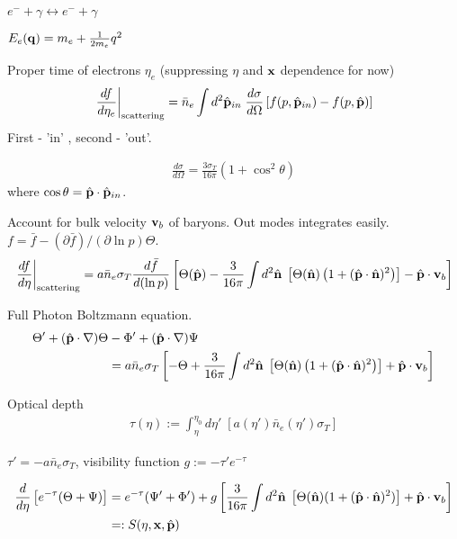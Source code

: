 $e^- + \gamma \leftrightarrow e^- + \gamma$

$E_e (\mathbf{q}) = m_e + \frac{1}{2m_e} q^2$

Proper time of electrons $\eta_e$ (suppressing $\eta$ and $\mathbf{x}$ dependence for now)
\begin{align}
	\left. \frac{df}{d\eta_e} \right|_\text{scattering} = \bar{n}_e \int d^2 \hat{\mathbf{p}}_{in} \; \frac{d\sigma}{d\Omega} \left[ f(p,\hat{\mathbf{p}}_{in}) - f(p,\hat{\mathbf{p}})\right]
\end{align}
First - 'in' , second - 'out'.

\begin{align}
	\frac{d\sigma}{d\Omega} = \frac{3\sigma_T}{16\pi} (1 + \cos^2 \theta)
\end{align}
where $\cos\theta = \hat{\mathbf{p}} \cdot \hat{\mathbf{p}}_{in}$.

Account for bulk velocity $\mathbf{v}_b$ of baryons. Out modes integrates easily. $f = \bar{f} - (\partial\bar{f})/(\partial\ln p) \Theta$.
\begin{align}
	\left. \frac{df}{d\eta} \right|_\text{scattering} = a \bar{n}_e \sigma_T \frac{d\bar{f}}{d(\ln p)}  \left[ \Theta(\hat{\mathbf{p}}) - \frac{3}{16\pi} \int d^2 \hat{\mathbf{n}} \; \left[ \Theta(\hat{\mathbf{n}}) \left( 1 + (\hat{\mathbf{p}} \cdot \hat{\mathbf{n}})^2 \right) \right] - \hat{\mathbf{p}} \cdot \mathbf{v}_b \right]
\end{align}

Full Photon Boltzmann equation.
\begin{align}
	\Theta' + (\hat{\mathbf{p}} \cdot \nabla) \Theta &- \Phi' +(\hat{\mathbf{p}} \cdot \nabla) \Psi  \nonumber \\	
	&= a \bar{n}_e \sigma_T \left[ -\Theta + \frac{3}{16\pi} \int d^2 \hat{\mathbf{n}} \; \left[ \Theta(\hat{\mathbf{n}}) \left( 1 + (\hat{\mathbf{p}} \cdot \hat{\mathbf{n}})^2 \right) \right] + \hat{\mathbf{p}} \cdot \mathbf{v}_b \right] 
\end{align}

Optical depth
\begin{align}
	\tau(\eta) := \int_\eta^{\eta_0} d\eta'\; \left[ a(\eta') \bar{n}_e (\eta') \sigma_T \right]
\end{align}

$\tau' = -a \bar{n}_e \sigma_T$, visibility function $g:=-\tau'e^{-\tau}$

\begin{align}
	\frac{d}{d\eta} \left[ e^{-\tau} (\Theta + \Psi) \right] &= e^{-\tau}(\Psi' + \Phi') + g \left[ \frac{3}{16\pi} \int d^2\hat{\mathbf{n}} \; \left[ \Theta(\hat{\mathbf{n}}) (1 + (\hat{\mathbf{p}} \cdot \hat{\mathbf{n}})^2) \right] + \hat{\mathbf{p}} \cdot \mathbf{v}_b \right] \\
	&=: S(\eta, \mathbf{x}, \hat{\mathbf{p}})
\end{align}

